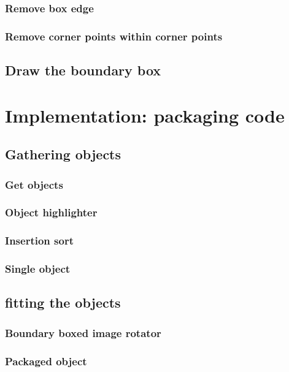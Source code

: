 \documentclass[10pt]{article}
\begin{document}
\subsubsection{Remove box edge}

\subsubsection{Remove corner points within corner points}

\subsection{Draw the boundary box}


\section{Implementation: packaging code}
\subsection{Gathering objects}
\subsubsection{Get objects}

\subsubsection{Object highlighter}

\subsubsection{Insertion sort}

\subsubsection{Single object}

\subsection{fitting the objects}
\subsubsection{Boundary boxed image rotator}

\subsubsection{Packaged object}

\end{document}
